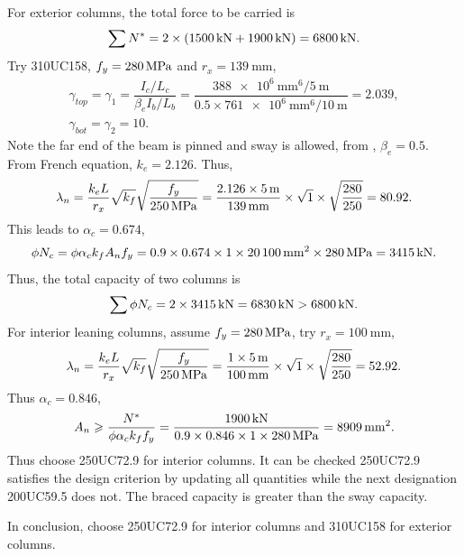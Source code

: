 \begin{solution}
For exterior columns, the total force to be carried is
\begin{gather*}
\sum{}N^*=2\times\left(\SI{1500}{\kilo\newton}+\SI{1900}{\kilo\newton}\right)=\SI{6800}{\kilo\newton}.
\end{gather*}
Try 310UC158, $f_y=\SI{280}{\mega\pascal}$ and $r_x=\SI{139}{\mm}$,
\begin{gather*}
\gamma_{top}=\gamma_1=\dfrac{I_c/L_c}{\beta_eI_b/L_b}=\dfrac{\SI{388e6}{\mm^6}/\SI{5}{\meter}}{0.5\times\SI{761e6}{\mm^6}/\SI{10}{\meter}}=2.039,\\
\gamma_{bot}=\gamma_2=10.
\end{gather*}
Note the far end of the beam is pinned and sway is allowed, from , $\beta_e=0.5$.
From French equation, $k_e=2.126$.
Thus,
\begin{gather*}
\lambda_n=\dfrac{k_eL}{r_x}\sqrt{k_f}\sqrt{\dfrac{f_y}{\SI{250}{\mega\pascal}}}=\dfrac{2.126\times\SI{5}{\meter}}{\SI{139}{\milli\meter}}\times\sqrt{1}\times\sqrt{\dfrac{280}{250}}=80.92.
\end{gather*}
This leads to $\alpha_c=0.674$,
\begin{gather*}
\phi{}N_c=\phi\alpha_ck_fA_nf_y=0.9\times0.674\times1\times\SI{20100}{\milli\meter^2}\times\SI{280}{\mega\pascal}=\SI{3415}{\kilo\newton}.
\end{gather*}
Thus, the total capacity of two columns is
\begin{gather*}
\sum\phi{}N_c=2\times\SI{3415}{\kilo\newton}=\SI{6830}{\kilo\newton}>\SI{6800}{\kilo\newton}.
\end{gather*}
For interior leaning columns, assume $f_y=\SI{280}{\mega\pascal}$, try $r_x=\SI{100}{\mm}$,
\begin{gather*}
\lambda_n=\dfrac{k_eL}{r_x}\sqrt{k_f}\sqrt{\dfrac{f_y}{\SI{250}{\mega\pascal}}}=\dfrac{1\times\SI{5}{\meter}}{\SI{100}{\milli\meter}}\times\sqrt{1}\times\sqrt{\dfrac{280}{250}}=52.92.
\end{gather*}
Thus $\alpha_c=0.846$,
\begin{gather*}
A_n\geqslant\dfrac{N^*}{\phi\alpha_ck_ff_y}=\dfrac{\SI{1900}{\kilo\newton}}{0.9\times0.846\times1\times\SI{280}{\mega\pascal}}=\SI{8909}{\milli\meter^2}.
\end{gather*}
Thus choose 250UC72.9 for interior columns.
It can be checked 250UC72.9 satisfies the design criterion by updating all quantities while the next designation 200UC59.5 does not.
The braced capacity is greater than the sway capacity.

In conclusion, choose 250UC72.9 for interior columns and 310UC158 for exterior columns.
\end{solution}
